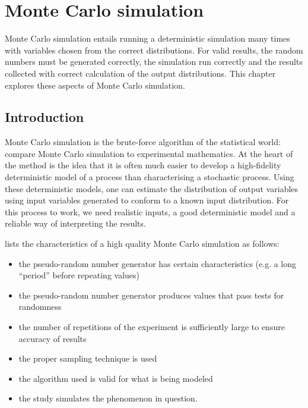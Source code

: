 \chapter{Monte Carlo simulation}

\begin{overview}
  Monte Carlo simulation entails running a deterministic simulation many times with variables chosen from the correct distributions.
  For valid results, the random numbers must be generated correctly, the simulation run correctly and the results collected with correct calculation of the output distributions.
  This chapter explores these aspects of Monte Carlo simulation.
\end{overview}

\section{Introduction}
Monte Carlo simulation is the brute-force algorithm of the statistical world:
\citet{hammersley.handscomb1965monte} compare Monte Carlo simulation to experimental mathematics.
At the heart of the method is the idea that it is often much easier to develop a high-fidelity deterministic model of a process than characterising a stochastic process.
Using these deterministic models, one can estimate the distribution of output variables using input variables generated to conform to a known input distribution.
For this process to work, we need realistic inputs, a good deterministic model and a reliable way of interpreting the results.


\citet{sawilowsky2003you} lists the characteristics of a high quality Monte Carlo simulation as follows:
\begin{itemize}
\item the pseudo-random number generator has certain characteristics (e.g. a long “period” before repeating values)
\item the pseudo-random number generator produces values that pass tests for randomness
\item the number of repetitions of the experiment is sufficiently large to ensure accuracy of results
\item the proper sampling technique is used
\item the algorithm used is valid for what is being modeled
\item the study simulates the phenomenon in question.
\end{itemize}

